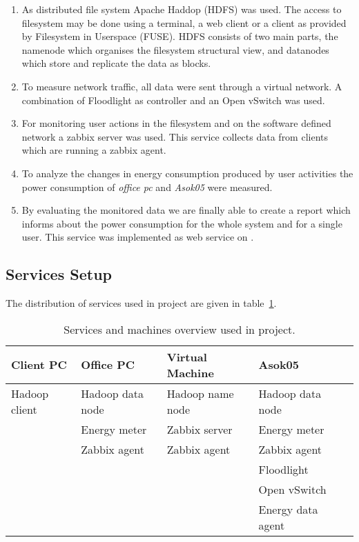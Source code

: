 \begin{enumerate}

\item As distributed file system Apache Haddop\textsuperscript{\textregistered} (HDFS) was used. The access to filesystem may be done using a terminal, a web client or a client as provided by Filesystem in Userspace (FUSE). HDFS consists of two main parts, the namenode which organises the filesystem structural view, and datanodes which store and replicate the data as blocks.

\item To measure network traffic, all data were sent through a virtual network. A combination of Floodlight as controller and an Open vSwitch was used. 

\item For monitoring user actions in the filesystem and on the software defined network a zabbix server was used. This service collects data from clients which are running a zabbix agent.

\item To analyze the changes in energy consumption produced by user activities the power consumption of \textit{office pc} and \textit{Asok05} were measured.

\item By evaluating the monitored data we are finally able to create a  report which informs about the power consumption for the whole system and for a single user. This service was implemented as web service on .

\end{enumerate}

\subsection{Services Setup}

The distribution of services used in project are given in table~\ref{tab:services}.


\begin{table}[b]
	\centering
	\caption{Services and machines overview used in project. }
	\begin{tabular}{|l|l|l|l|l|}
		\hline \rule[-2ex]{0pt}{5.5ex} \textbf{Client PC} & \textbf{Office PC} & \textbf{Virtual Machine} & \textbf{Asok05} \\ 
		\hline \rule[-2ex]{0pt}{5.5ex} Hadoop client & Hadoop data node & Hadoop name node & Hadoop data node \\ 
		       \rule[-2ex]{0pt}{5.5ex}  & Energy meter & Zabbix server & Energy meter \\ 
		       \rule[-2ex]{0pt}{5.5ex}  & Zabbix agent & Zabbix agent & Zabbix agent \\ 
		       \rule[-2ex]{0pt}{5.5ex}  &  &  & Floodlight \\ 
		       \rule[-2ex]{0pt}{5.5ex}  &  &  & Open vSwitch \\ 
		       \rule[-2ex]{0pt}{5.5ex}  &  &  & Energy data agent \\ 
		\hline 
	\end{tabular}
	\label{tab:services}
\end{table}
